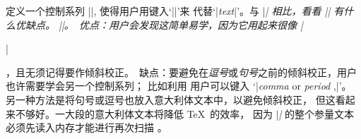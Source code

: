 \smallskip
\dangerexercise 定义一个控制系列 |\ital|, 使得用户用键入`||'来%
代替`|{\it text\/}|'。与 |\it| 相比，看看 |\ital| 有什么优缺点。
\answer |\def\ital#1{{\it#1\/}}|。\
优点：用户会发现这简单易学，因为它用起来很像 |\centerline|，且无须记得要作倾斜校正。\
缺点：要避免在{\it 逗号}或{\it 句号}之前的倾斜校正，用户也许需要学会另一个控制系列；
比如利用
\begintt
\def\nocorr{\kern0pt }
\endtt
用户可以键入 `|\ital{comma} or \ital{period\nocorr},|'。
另一种方法是将句号或逗号也放入意大利体文本中，以避免倾斜校正，
但这看起来不够好。一大段的意大利体文本将降低 \TeX\ 的效率，
因为 |\ital| 的整个参量文本必须先读入内存才能进行再次扫描 。


